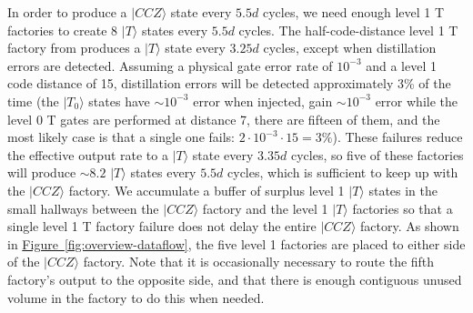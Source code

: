 \documentclass[twocolumn,accepted=2019-03-30]{quantumarticle}
\newcommand{\fig}[1]{\hyperref[fig:#1]{Figure~\ref*{fig:#1}}}
\begin{document}
In order to produce a $|CCZ\rangle$ state every $5.5d$ cycles, we need enough level 1 T factories to create 8 $|T\rangle$ states every $5.5d$ cycles.
The half-code-distance level 1 T factory from \cite{fowler2018} produces a $|T\rangle$ state every $3.25d$ cycles, except when distillation errors are detected.
Assuming a physical gate error rate of $10^{-3}$ and a level 1 code distance of 15, distillation errors will be detected approximately 3\% of the time (the $|T_0\rangle$ states have $\sim 10^{-3}$ error when injected, gain $\sim 10^{-3}$ error while the level 0 T gates are performed at distance 7, there are fifteen of them, and the most likely case is that a single one fails: $2 \cdot 10^{-3} \cdot 15 = 3\%$).
These failures reduce the effective output rate to a $|T\rangle$ state every $3.35d$ cycles, so five of these factories will produce $\sim 8.2$ $|T\rangle$ states every $5.5d$ cycles, which is sufficient to keep up with the $|CCZ\rangle$ factory.
We accumulate a buffer of surplus level 1 $|T\rangle$ states in the small hallways between the $|CCZ\rangle$ factory and the level 1 $|T\rangle$ factories so that a single level 1 T factory failure does not delay the entire $|CCZ\rangle$ factory.
As shown in \fig{overview-dataflow}, the five level 1 factories are placed to either side of the $|CCZ\rangle$ factory.
Note that it is occasionally necessary to route the fifth factory's output to the opposite side, and that there is enough contiguous unused volume in the factory to do this when needed.
\end{document}
